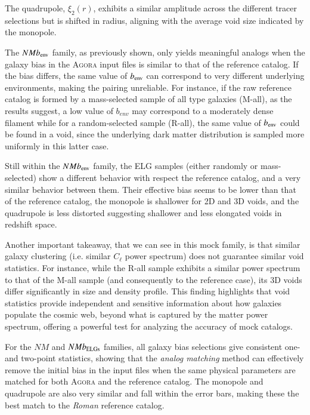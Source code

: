 \documentclass[]{aa} %
\begin{document}
The quadrupole, $\xi_2(r)$, exhibits a similar amplitude across the different tracer selections but is shifted in radius, aligning with the average void size indicated by the monopole.

The $NMb_{\rm env}$ family, as previously shown, only yields meaningful analogs when the galaxy bias in the \textsc{Agora} input files is similar to that of the reference catalog. If the bias differs, the same value of $b_{\rm env}$ can correspond to very different underlying environments, making the pairing unreliable. For instance, if the raw reference catalog is formed by a mass-selected sample of all type galaxies (M-all), as the results suggest, a low value of $b_{env}$ may correspond to a moderately dense filament while for a random-selected sample (R-all), the same value of $b_{\rm env}$ could be found in a void, since the underlying dark matter distribution is sampled more uniformly in this latter case.

Still within the $NMb_{\rm env}$ family, the ELG samples (either randomly or mass-selected) show a different behavior with respect the reference catalog, and a very similar behavior between them. Their effective bias seems to be lower than that of the reference catalog, the monopole is shallower for 2D and 3D voids, and the quadrupole is less distorted suggesting shallower and less elongated voids in redshift space.

Another important takeaway, that we can see in this mock family, is that similar galaxy clustering (i.e. similar $C_\ell$ power spectrum) does not guarantee similar void statistics. For instance, while the R-all sample exhibits a similar power spectrum to that of the M-all sample (and consequently to the reference case), its 3D voids differ significantly in size and density profile. This finding highlights that void statistics provide independent and sensitive information about how galaxies populate the cosmic web, beyond what is captured by the matter power spectrum, offering a powerful test for analyzing the accuracy of mock catalogs. 

For the $NM$ and $NMb_{\rm ELGs}$ families, all galaxy bias selections give consistent one- and two-point statistics, showing that the \emph{analog matching} method can effectively remove the initial bias in the input files when the same physical parameters are matched for both \textsc{Agora} and the reference catalog. The monopole and quadrupole are also very similar and fall within the error bars, making these the best match to the \emph{Roman} reference catalog.
\end{document}
